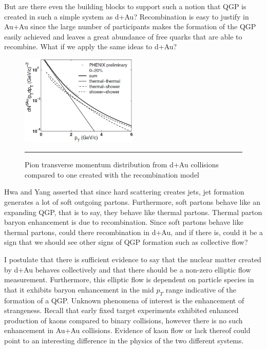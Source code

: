 But are there even the building blocks to support such a notion that QGP is created in such a simple system as d+Au? Recombination is easy to justify in Au+Au since the large number of participants makes the formation of the QGP easily achieved and leaves a great abundance of free quarks that are able to recombine. What if we apply the same ideas to d+Au? 
\begin{figure}[b!]
  \centering
    \includegraphics[width=0.5\textwidth]{prevplots/daurecomb.JPG}
    \rule{35em}{0.5pt}
  \caption[Pion transverse momentum distribution from d+Au collisions compared to one created with the recombination model]{Pion transverse momentum distribution from d+Au collisions compared to one created with the recombination model}
  \label{fig:daaaratios}
\end{figure}
Hwa and Yang asserted \citep{PhysRevLett.93.082302} that since hard scattering creates jets, jet formation generates a lot of soft outgoing partons. Furthermore, soft partons behave like an expanding QGP, that is to say, they behave like thermal partons. Thermal parton baryon enhancement is due to recombination. Since soft partons behave like thermal partons, could there recombination in d+Au, and if there is, could it be a sign that we should see other signs of QGP formation such as collective flow? 

I postulate that there is sufficient evidence to say that the nuclear matter created by d+Au behaves collectively and that there should be a non-zero elliptic flow measurement. Furthermore, this elliptic flow is dependent on particle species in that it exhibits baryon enhancement in the mid $p_T$ range indicative of the formation of a QGP. Unknown phenomena of interest is the enhancement of strangeness. Recall that early fixed target experiments exhibited enhanced production of kaons compared to binary collisions, however there is no such enhancement in Au+Au collisions. Evidence of kaon flow or lack thereof could point to an interesting difference in the physics of the two different systems.

\pagebreak
\pagebreak
